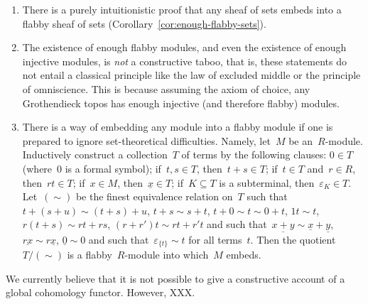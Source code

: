 \documentclass[oneside]{amsart}
\theoremstyle{definition}
\theoremstyle{plain}
\theoremstyle{remark}
\renewcommand{\_}{\mathpunct{.}\,}
\begin{document}
\begin{enumerate}
\item There is a purely intuitionistic proof that any sheaf of sets embeds into
a flabby sheaf of sets (Corollary~\ref{cor:enough-flabby-sets}).
\item The existence of enough flabby modules, and even the existence of enough
injective modules, is \emph{not} a constructive taboo, that is, these statements do not
entail a classical principle like the law of excluded middle or the principle
of omniscience. This is because assuming the axiom of choice, any
Grothendieck topos has enough injective (and therefore flabby) modules. 
\item There is a way of embedding any module into a flabby module if one is
prepared to ignore set-theoretical difficulties. Namely, let~$M$ be an~$R$-module.
Inductively construct a collection~$T$ of terms by the following clauses: $0
\in T$ (where~$0$ is a formal symbol);
if~$t,s \in T$, then~$t + s \in T$; if~$t \in T$ and~$r \in R$, then~$rt \in
T$; if~$x \in M$, then~$\underline{x} \in T$; if~$K \subseteq T$ is a
subterminal, then~$\varepsilon_K \in T$. Let~$({\sim})$ be
the finest equivalence relation on~$T$ such that~$t + (s + u) \sim (t + s) +
u$, $t + s \sim s + t$, $t + 0 \sim t \sim 0 + t$, $1t \sim t$, $r(t+s) \sim rt
+ rs$, $(r+r')t \sim rt + r't$ and such
that~$\underline{x+y} \sim \underline{x} + \underline{y}$, $\underline{rx} \sim
r \underline{x}$, $\underline{0} \sim 0$ and such that~$\varepsilon_{\{t\}} \sim
t$ for all terms~$t$. Then the quotient~$T/({\sim})$ is a flabby~$R$-module
into which~$M$ embeds.
\end{enumerate}

We currently believe that it is not possible to give a constructive account of
a global cohomology functor. However, XXX.
\end{document}
